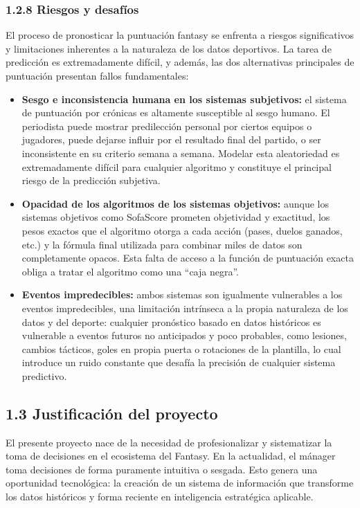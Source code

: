 \subsubsection{1.2.8 Riesgos y desafíos}

El proceso de pronosticar la puntuación fantasy se enfrenta a riesgos significativos y limitaciones 
inherentes a la naturaleza de los datos deportivos.
La tarea de predicción es extremadamente difícil, y además, las dos alternativas principales de 
puntuación presentan fallos fundamentales:

\begin{itemize}
\item \textbf{Sesgo e inconsistencia humana en los sistemas subjetivos:} el sistema de puntuación 
por crónicas es altamente susceptible al sesgo humano.
El periodista puede mostrar predilección personal por ciertos equipos o jugadores, puede dejarse 
influir por el resultado final del partido, o ser inconsistente en su criterio semana a semana.
Modelar esta aleatoriedad es extremadamente difícil para cualquier algoritmo y constituye el 
principal riesgo de la predicción subjetiva.

\item \textbf{Opacidad de los algoritmos de los sistemas objetivos:} aunque los sistemas objetivos 
como SofaScore prometen objetividad y exactitud, los pesos exactos que el algoritmo otorga a cada 
acción (pases, duelos ganados, etc.) y la fórmula final utilizada para combinar miles de datos son 
completamente opacos.
Esta falta de acceso a la función de puntuación exacta obliga a tratar el algoritmo como una 
``caja negra''.

\item \textbf{Eventos impredecibles:} ambos sistemas son igualmente vulnerables a los eventos 
impredecibles, una limitación intrínseca a la propia naturaleza de los datos y del deporte: 
cualquier pronóstico basado en datos históricos es vulnerable a eventos futuros no anticipados y 
poco probables, como lesiones, cambios tácticos, goles en propia puerta o rotaciones de la 
plantilla, lo cual introduce un ruido constante que desafía la precisión de cualquier sistema 
predictivo.
\end{itemize}

\subsection{1.3 Justificación del proyecto}

El presente proyecto nace de la necesidad de profesionalizar y sistematizar la toma de decisiones 
en el ecosistema del Fantasy.
En la actualidad, el mánager toma decisiones de forma puramente intuitiva o sesgada.
Esto genera una oportunidad tecnológica: la creación de un sistema de información que transforme 
los datos históricos y forma reciente en inteligencia estratégica aplicable.

